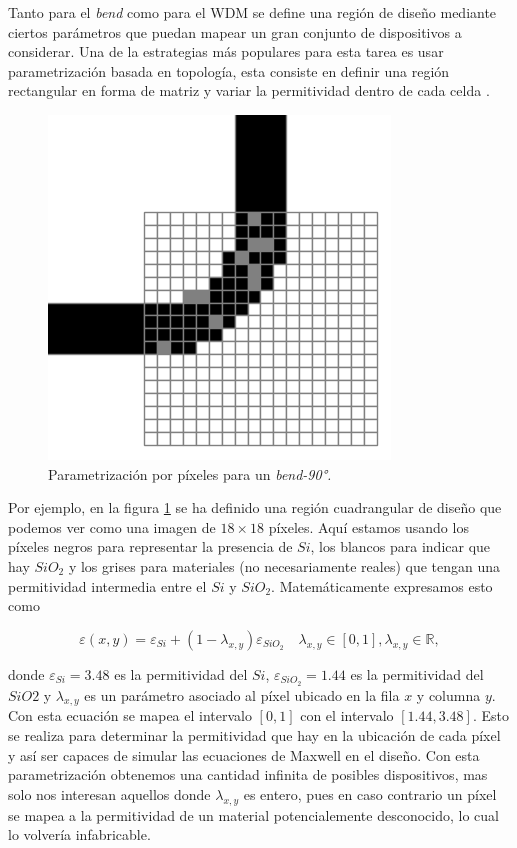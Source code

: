 Tanto para el \emph{bend} como para el WDM se define una región de diseño
mediante ciertos parámetros que puedan mapear un gran conjunto de dispositivos a considerar.
Una de la estrategias más populares para esta tarea es usar parametrización
basada en topología, esta consiste en definir una región rectangular en forma
de matriz y variar la permitividad dentro de cada celda \citep{Molesky2018}.

\begin{figure}[h]
  \centering
  \includegraphics[scale=0.7]{image/theory/parametrization-pixeles.png}
  \caption{Parametrización por píxeles para un \emph{bend-90°.}}
  \label{fig:pixeles}
\end{figure}

Por ejemplo, en la figura \ref{fig:pixeles} se ha definido una región cuadrangular de
diseño que podemos ver como una imagen de $18 \times 18$ píxeles.
Aquí estamos usando los píxeles negros para representar la presencia de $Si$,
los blancos para indicar que hay $SiO_2$ y los grises para materiales (no
necesariamente reales) que tengan una permitividad intermedia entre el $Si$
y $SiO_2$. Matemáticamente expresamos esto como

\begin{equation}
  \varepsilon(x, y) = \varepsilon_{Si} + (1 - \lambda_{x,y})
  \varepsilon_{SiO_2} \quad \lambda_{x, y} \in [0, 1], \lambda_{x, y} \in
  \mathbb{R}, 
\label{eq:permitivity}
\end{equation}

donde $\varepsilon_{Si} = 3.48$ es la permitividad del $Si$,
$\varepsilon_{SiO_2} = 1.44$ es la permitividad del $SiO2$ y $\lambda_{x, y}$
es un parámetro asociado al píxel ubicado en la fila $x$ y columna $y$.
Con esta ecuación se mapea el intervalo $[0, 1]$ con el intervalo $[1.44, 3.48]$. 
Esto se realiza para determinar la permitividad que hay en la ubicación de cada
píxel y así ser capaces de simular las ecuaciones de Maxwell en el diseño.
Con esta parametrización obtenemos una cantidad infinita de posibles dispositivos, 
mas solo nos interesan aquellos donde $\lambda_{x,y}$ es entero, 
pues en caso contrario un píxel se mapea a la permitividad de un material
potencialemente desconocido, lo cual lo volvería infabricable.

